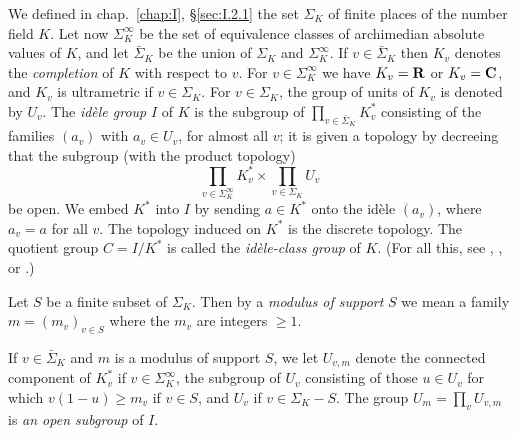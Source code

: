 


We defined in chap.~\ref{chap:I}, \S\ref{sec:I.2.1} the set $\Sigma_K$ of
finite places of the number field $K$.  Let now $\Sigma_K^\infty$ be the
set of equivalence classes of archimedian absolute values of $K$, and let
$\bar{\Sigma}_K$ be the union of $\Sigma_K$ and $\Sigma_K^\infty$.  If
$v \in \bar{\Sigma}_K$ then $K_v$ denotes the \emph{completion} of $K$
with respect to $v$.  For $v \in \Sigma_K^\infty$ we have $K_v = \mathbf{R}$ or
$K_v = \mathbf{C}$, and $K_v$ is ultrametric if $v \in \Sigma_K$.  For
$v \in \Sigma_K$, the group of units of $K_v$ is denoted by $U_v$.  The
\emph{idèle group} $I$ of $K$ is the subgroup of
$\prod\limits_{v \in \bar{\Sigma}_K} K_v^*$ consisting of the families
$(a_v)$ with $a_v \in U_v$, for almost all $v$; it is given a topology by
decreeing that the subgroup (with the product topology)
\[
\prod_{v \in \Sigma_K^\infty} K_v^* \times \prod_{v \in \Sigma_K} U_v
\]
be open.  We embed $K^*$ into $I$ by sending $a \in K^*$ onto the idèle
$(a_v)$, where $a_v = a$ for all $v$.  The topology induced on $K^*$ is
the discrete topology.  The quotient group $C = I/K^*$ is called the
\emph{idèle-class group} of $K$.  (For all this, see
\cite{cassels-frohlich}, \cite{lang-abelian}, or \cite{weil-bnt}.)

Let $S$ be a finite subset of $\Sigma_K$.  Then by a \emph{modulus of
support} $S$ we mean a family $m = (m_v)_{v \in S}$ where the $m_v$ are
integers $\geq 1$.

If $v \in \bar{\Sigma}_K$ and $m$ is a modulus of support $S$, we let
$U_{v,m}$ denote the connected component of $K_v^*$ if
$v \in \Sigma_K^\infty$, the subgroup of $U_v$ consisting of those
$u \in U_v$ for which $v(1-u) \geq m_v$ if $v \in S$, and $U_v$ if
$v \in \Sigma_K - S$.  The group $U_m = \prod\limits_v U_{v,m}$ is
\emph{an open subgroup} of $I$.

